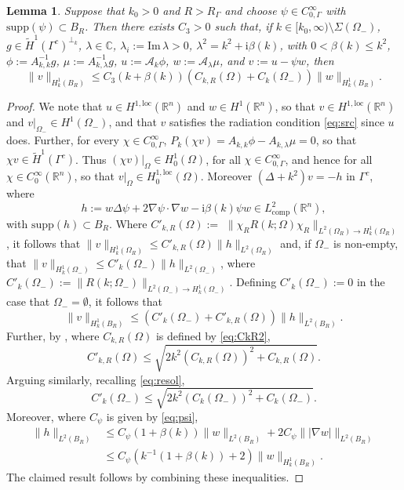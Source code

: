 \documentclass{birkjour}
\newtheorem{lemma}[theorem]{Lemma}
\theoremstyle{definition}
\theoremstyle{remark}
\numberwithin{equation}{section}
\newcommand{\R}{\mathbb{R}}
\newcommand{\C}{\mathbb{C}}
\newcommand{\Hol}{H^{1,\mathrm{loc}}}
\newcommand{\ri}{\mathrm{i}}
\newcommand{\cA}{\mathcal{A}}
\newcommand{\supp}{\mathrm{supp}}
\begin{document}
\begin{lemma} \label{lem:step3} Suppose that $k_0>0$ and $R>R_\Gamma$ and choose $\psi\in C_{0,\Gamma}^\infty$ with $\supp(\psi)\subset B_R$. Then there exists $C_3>0$ such that, if  $k\in [k_0,\infty)\setminus \Sigma(\Omega_-)$, $g\in \widetilde H^1(\Gamma^c)^{\perp_k}$, $\lambda\in \C$, $\lambda_i := \mathrm{Im}\, \lambda >0$, $\lambda^2=k^2+\ri \beta(k)$, with $0<\beta(k)\leq k^2$, $\phi:=A_{k,k}^{-1}g$, $\mu:= A_{k,\lambda}^{-1}g$, $u:= \cA_k\phi$, $w:= \cA_\lambda \mu$, and $v:= u-\psi w$, then 
\begin{equation} \label{eq:lem3}
\|v\|_{H^1_k(B_R)} \leq C_3 (k+\beta(k))\left(C_{k,R}(\Omega)+C_k(\Omega_-)\right) \|w\|_{H^1_k(B_R)}.
\end{equation}
\end{lemma}
\begin{proof}
We note that $u\in \Hol(\R^n)$ and $w\in H^1(\R^n)$, so that $v\in \Hol(\R^n)$ and $v|_{\Omega_-}\in H^1(\Omega_-)$, and that $v$ satisfies the radiation condition \eqref{eq:src} since $u$ does. Further, for every $\chi\in C_{0,\Gamma}^\infty$, $P_k(\chi v) = A_{k,k}\phi-A_{k,\lambda}\mu =0$, so that $\chi v\in \widetilde H^1(\Gamma^c)$. Thus $(\chi v)|_\Omega \in H_{0}^1(\Omega)$, for all $\chi\in C_{0,\Gamma}^\infty$, and hence for all $\chi\in C_0^\infty(\R^n)$, so that $v|_\Omega \in \Hol_0(\Omega)$. Moreover $(\Delta+k^2)v = -h$ in $\Gamma^c$, where
$$
h := w\Delta\psi+2\nabla\psi\cdot\nabla w-\ri \beta(k)\psi w \in L^2_{\mathrm{comp}}(\R^n),
$$
with $\supp(h)\subset B_R$.  Where  $C'_{k,R}(\Omega):=$ $\|\chi_R R(k;\Omega)\chi_R\|_{L^2(\Omega_R)\to H^1_k(\Omega_R)}$, it follows that $\|v\|_{H^1_k(\Omega_R)} \leq C'_{k,R}(\Omega)\|h\|_{L^2(\Omega_R)}$ and, if $\Omega_-$ is non-empty, that $\|v\|_{H^1_k(\Omega_-)} \leq C'_k(\Omega_-)\|h\|_{L^2(\Omega_-)}$, where
 $C'_k(\Omega_-) := \|R(k;\Omega_-)\|_{L^2(\Omega_-)\to H^1_k(\Omega_-)}$. Defining $C'_k(\Omega_-) := 0$ in the case that $\Omega_-=\emptyset$, it follows that 
$$
\|v\|_{H^1_k(B_R)} \leq \left(C'_k(\Omega_-)+C'_{k,R}(\Omega)\right) \|h\|_{L^2(B_R)}.
$$
Further, by \cite[Equation (10)]{SiavashSimon0}, where $C_{k,R}(\Omega)$ is defined by \eqref{eq:CkR2},
$$
C'_{k,R}(\Omega) \leq \sqrt{2k^2 (C_{k,R}(\Omega))^2 + C_{k,R}(\Omega)}.
$$
Arguing similarly, recalling \eqref{eq:resol},
$$
C'_{k}(\Omega_-) \leq \sqrt{2k^2 (C_{k}(\Omega_-))^2 + C_{k}(\Omega_-)}.
$$
Moreover, where $C_\psi$ is given by \eqref{eq:psi},
\begin{align*}
\|h\|_{L^2(B_R)} &\leq C_\psi (1+\beta(k)) \|w\|_{L^2(B_R)} + 2C_\psi \| |\nabla w|\|_{L^2(B_R)}\\ & \leq C_\psi (k^{-1}(1+\beta(k))+2) \|w\|_{H^1_k(B_R)}.
\end{align*}
The claimed result follows by combining these inequalities.
\end{proof}
\end{document}
